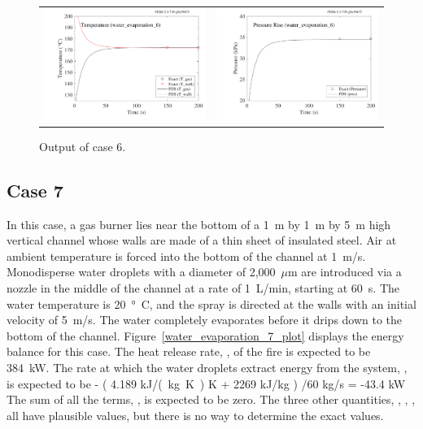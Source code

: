\documentclass[11pt]{book}
\begin{document}
\begin{figure}[h!]
\noindent
\begin{tabular*}{\textwidth}{l@{\extracolsep{\fill}}r}
\includegraphics[width=3.2in]{SCRIPT_FIGURES/water_evaporation_6_T} &
\includegraphics[width=3.2in]{SCRIPT_FIGURES/water_evaporation_6_P}
\end{tabular*}
\caption[Sample case ]{Output of  case 6.}
\label{water_evaporation_6_plots}
\end{figure}

\subsection{Case 7}
\label{water_evaporation_7}

In this case, a gas burner lies near the bottom of a 1~m by 1~m by 5~m high vertical channel whose walls are made of a thin sheet of insulated steel. Air at ambient temperature is forced into the bottom of the channel at 1~m/s. Monodisperse water droplets with a diameter of 2,000~$\mu$m are
introduced via a nozzle in the middle of the channel at a rate of 1~L/min, starting at 60~s. The water temperature is 20~\si{\degree C}, and the spray is directed at the walls with an initial velocity of 5~m/s.
The water completely evaporates before it drips down to the bottom of the channel.
Figure~\ref{water_evaporation_7_plot} displays the energy balance for this case. The heat release rate, , of the fire is expected to be 384~kW. The rate at which the water droplets extract energy from the system, , is expected to be
\be - \left( 4.189 \; \hbox{\si{kJ/(kg.K)}}  \; \hbox{K} + 2269 \; \hbox{kJ/kg} \right) /60 \; \hbox{kg/s} = -43.4 \; \hbox{kW} \ee
The sum of all the terms, , is expected to be zero. The three other quantities, , , , all have plausible values, but there is no way to determine the exact values.
\end{document}
